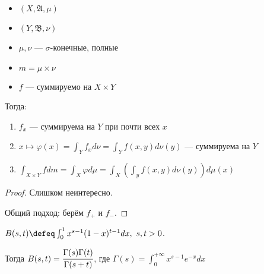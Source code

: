 \begin{theorem}[Фубини]\itemfix
    \begin{itemize}
        \item \((X, \mathfrak{A}, \mu)\)
        \item \((Y, \mathfrak{B}, \nu)\)
        \item \(\mu, \nu\) --- \(\sigma\)-конечные, полные
        \item \(m = \mu \times \nu\)
        \item \(f\) --- суммируемо на \(X \times Y\)
    \end{itemize}

    Тогда:
    \begin{enumerate}
        \item \(f_x\) --- суммируема на \(Y\) при почти всех \(x\)
        \item \(x \mapsto \varphi(x) = \int_Y f_x d\nu = \int_Y f(x, y) d\nu(y)\) --- суммируема на \(Y\)
        \item \(\int_{X \times Y} f dm = \int_X \varphi d \mu = \int_X \left( \int_y f(x, y) d\nu(y) \right) d\mu(x)\)
    \end{enumerate}
\end{theorem}
\begin{proof}
    Слишком неинтересно.

    Общий подход: берём \(f_{ +}\) и \(f_{ -}\).
\end{proof}

\begin{example}
    \(B(s, t) \defeq \int_0^1 x^{s - 1} (1 - x)^{t - 1} dx,\ s, t > 0\).

    Тогда \(B(s, t) = \cfrac{\Gamma(s)\Gamma(t)}{\Gamma(s + t)}\), где \(\Gamma(s) = \int_0^{+\infty} x^{s - 1}e^{ - x}dx\)
\end{example}

